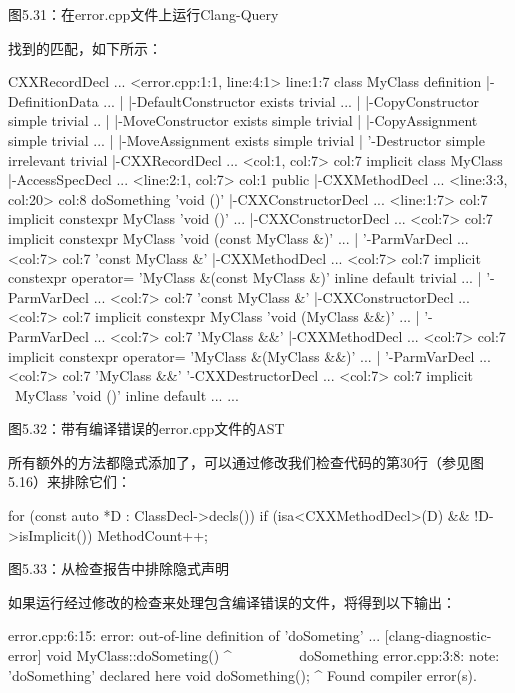 \begin{center}
图5.31：在error.cpp文件上运行Clang-Query
\end{center}

找到的匹配，如下所示：

\begin{shell}
CXXRecordDecl ... <error.cpp:1:1, line:4:1> line:1:7 class MyClass
definition
|-DefinitionData ...
| |-DefaultConstructor exists trivial ...
| |-CopyConstructor simple trivial ..
| |-MoveConstructor exists simple trivial
| |-CopyAssignment simple trivial ...
| |-MoveAssignment exists simple trivial
| '-Destructor simple irrelevant trivial
|-CXXRecordDecl ... <col:1, col:7> col:7 implicit class MyClass
|-AccessSpecDecl ... <line:2:1, col:7> col:1 public
|-CXXMethodDecl ... <line:3:3, col:20> col:8 doSomething 'void ()'
|-CXXConstructorDecl ... <line:1:7> col:7 implicit constexpr MyClass
'void ()' ...
|-CXXConstructorDecl ... <col:7> col:7 implicit constexpr MyClass
'void (const MyClass &)' ...
| '-ParmVarDecl ... <col:7> col:7 'const MyClass &'
|-CXXMethodDecl ... <col:7> col:7 implicit constexpr operator= 'MyClass
&(const MyClass &)' inline default trivial ...
| '-ParmVarDecl ... <col:7> col:7 'const MyClass &'
|-CXXConstructorDecl ... <col:7> col:7 implicit constexpr MyClass 'void
(MyClass &&)' ...
| '-ParmVarDecl ... <col:7> col:7 'MyClass &&'
|-CXXMethodDecl ... <col:7> col:7 implicit constexpr operator= 'MyClass
&(MyClass &&)' ...
| '-ParmVarDecl ... <col:7> col:7 'MyClass &&'
'-CXXDestructorDecl ... <col:7> col:7 implicit ~MyClass 'void ()' inline
default ...
...
\end{shell}

\begin{center}
图5.32：带有编译错误的error.cpp文件的AST
\end{center}

所有额外的方法都隐式添加了，可以通过修改我们检查代码的第30行（参见图5.16）来排除它们：

\begin{cpp}
for (const auto *D : ClassDecl->decls()) {
  if (isa<CXXMethodDecl>(D) && !D->isImplicit())
    MethodCount++;
}
\end{cpp}

\begin{center}
图5.33：从检查报告中排除隐式声明
\end{center}

如果运行经过修改的检查来处理包含编译错误的文件，将得到以下输出：

\begin{shell}
error.cpp:6:15: error: out-of-line definition of 'doSometing' ...
[clang-diagnostic-error]
void MyClass::doSometing() {}
              ^~~~~~~~~~
doSomething
error.cpp:3:8: note: 'doSomething' declared here
  void doSomething();
       ^
Found compiler error(s).
\end{shell}

